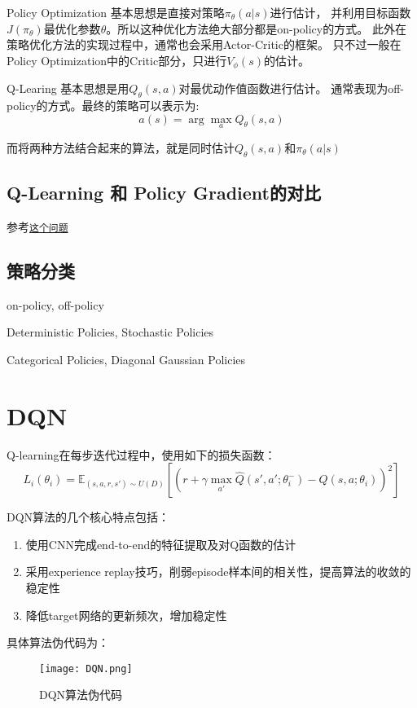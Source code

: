 Policy Optimization 基本思想是直接对策略$\pi_\theta(a|s)$进行估计，
并利用目标函数$J(\pi_\theta)$最优化参数$\theta$。所以这种优化方法绝大部分都是on-policy的方式。
此外在策略优化方法的实现过程中，通常也会采用Actor-Critic的框架。
只不过一般在Policy Optimization中的Critic部分，只进行$V_\phi(s)$的估计。

Q-Learing 基本思想是用$Q_\theta(s,a)$对最优动作值函数进行估计。
通常表现为off-policy的方式。最终的策略可以表示为:
\begin{equation*}
a(s) = \arg \max_a Q_\theta(s,a)
\end{equation*}

而将两种方法结合起来的算法，就是同时估计$Q_\theta(s,a)$和$\pi_\theta(a|s)$

\subsection{Q-Learning 和 Policy Gradient的对比}
参考\href{https://www.zhihu.com/question/49787932}{\texttt{这个问题}}




\subsection{策略分类}
on-policy, off-policy

Deterministic Policies, Stochastic Policies

Categorical Policies, Diagonal Gaussian Policies

\section{DQN}
Q-learning在每步迭代过程中，使用如下的损失函数：
\begin{equation*}
    L_i(\theta_i) = \mathbb{E}_{(s,a,r,s')\sim U(D)} \left[ \left( r+\gamma \max_{a'} \hat{Q}(s',a';\theta_i^-) - Q(s,a;\theta_i) \right)^2 \right]
\end{equation*}

DQN算法的几个核心特点包括：
\begin{enumerate}
    \item 使用CNN完成end-to-end的特征提取及对Q函数的估计
    \item 采用experience replay技巧，削弱episode样本间的相关性，提高算法的收敛的稳定性
    \item 降低target网络的更新频次，增加稳定性
\end{enumerate}

具体算法伪代码为：
\begin{figure}[htbp]
	\figskip 
	\centering
	\texttt{[image: DQN.png]}	  
	\caption{\label{fig: dqn} DQN算法伪代码}
\end{figure}

